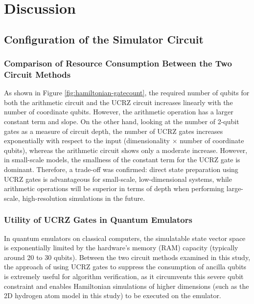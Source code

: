 \documentclass[wabun2025.tex]{subfiles}
\begin{document}
\section{Discussion}
\label{sec:analysis}
\subsection{Configuration of the Simulator Circuit}
\label{sec:circuit-structure-analysis}
\subsubsection{Comparison of Resource Consumption Between the Two Circuit Methods}
As shown in Figure \ref{fig:hamiltonian-gatecount}, the required number of
qubits for both the arithmetic circuit and the UCRZ circuit increases linearly
with the number of coordinate qubits. However, the arithmetic operation has a
larger constant term and slope. On the other hand, looking at the number of
2-qubit gates as a measure of circuit depth, the number of UCRZ gates increases
exponentially with respect to the input (dimensionality $\times$ number of
coordinate qubits), whereas the arithmetic circuit shows only a moderate
increase. However, in small-scale models, the smallness of the constant term for
the UCRZ gate is dominant. Therefore, a trade-off was confirmed: direct state
preparation using UCRZ gates is advantageous for small-scale, low-dimensional
systems, while arithmetic operations will be superior in terms of depth when
performing large-scale, high-resolution simulations in the future.

\subsubsection{Utility of UCRZ Gates in Quantum Emulators}
In quantum emulators on classical computers, the simulatable state vector space
is exponentially limited by the hardware's memory (RAM) capacity (typically
around 20 to 30 qubits). Between the two circuit methods examined in this study,
the approach of using UCRZ gates to suppress the consumption of ancilla qubits
is extremely useful for algorithm verification, as it circumvents this severe
qubit constraint and enables Hamiltonian simulations of higher dimensions (such
as the 2D hydrogen atom model in this study) to be executed on the emulator.
\end{document}
